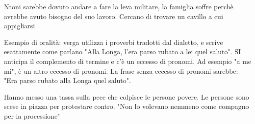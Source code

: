 \documentclass{article}
\begin{document}
    Ntoni sarebbe dovuto andare a fare la leva militare, la famiglia soffre perchè avrebbe avuto bisogno del suo lavoro. Cercano di trovare un cavillo a cui appigliarsi

    Esempio di oralità: verga utilizza i proverbi tradotti dal dialetto, e scrive esattamente come parlano "Alla Longa, l'era parso rubato a lei quel saluto". SI anticipa il complemento di termine e c'è un eccesso di pronomi. Ad esempio "a me mi", è un altro eccesso di pronomi. La frase senza eccesso di pronomi sarebbe: "Era parso rubato alla Longa quel saluto".

    Hanno messo una tassa sulla pece che colpisce le persone povere. Le persone sono scese in piazza per protestare contro.
    "Non lo volevano nemmeno come compagno per la processione"
\end{document}
